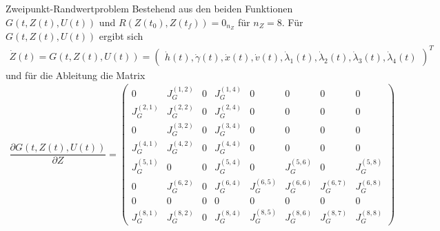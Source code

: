 \documentclass[aspectratio=169]{beamer}
\begin{document}
\begin{frame}
\begin{block}{Zweipunkt-Randwertproblem} 
  \scriptsize
Bestehend aus den beiden Funktionen $G(t,Z(t),U(t))$ und $R(Z(t_0),Z(t_f)) = 0_{n_Z}$ für $n_Z = 8$. Für $G(t,Z(t),U(t))$ ergibt sich
\begin{align*} 
    \dot{Z}(t) = G(t,Z(t),U(t)) = 
    \begin{pmatrix}
        \dot{h}(t),\dot{\gamma}(t),\dot{x}(t),\dot{v}(t),\dot{\lambda}_1(t),\dot{\lambda}_2(t),\dot{\lambda}_3(t),\dot{\lambda}_4(t)
    \end{pmatrix}^T
\end{align*}
und für die Ableitung die Matrix
\begin{align*} 
    \dfrac{\partial G(t,Z(t),U(t))}{\partial Z} = 
    \begin{pmatrix}
        0 & J_G^{(1,2)} & 0 & J_G^{(1,4)} & 0 & 0 & 0 & 0 \\ 
        J_G^{(2,1)} & J_G^{(2,2)} & 0 & J_G^{(2,4)} & 0 & 0 & 0 & 0 \\ 
        0 & J_G^{(3,2)} & 0 & J_G^{(3,4)} & 0 & 0 & 0 & 0 \\ 
        J_G^{(4,1)} & J_G^{(4,2)} & 0 & J_G^{(4,4)} & 0 & 0 & 0 & 0 \\
        J_G^{(5,1)} & 0 & 0 & J_G^{(5,4)} & 0 & J_G^{(5,6)} & 0 & J_G^{(5,8)} \\
        0 & J_G^{(6,2)} & 0 & J_G^{(6,4)} & J_G^{(6,5)} & J_G^{(6,6)} & J_G^{(6,7)} & J_G^{(6,8)} \\
        0 & 0 & 0 & 0 & 0 & 0 & 0 & 0 \\
        J_G^{(8,1)} & J_G^{(8,2)} & 0 & J_G^{(8,4)} & J_G^{(8,5)} & J_G^{(8,6)} & J_G^{(8,7)} & J_G^{(8,8)}
    \end{pmatrix}
\end{align*}
   \end{block}
\end{frame}
\end{document}
